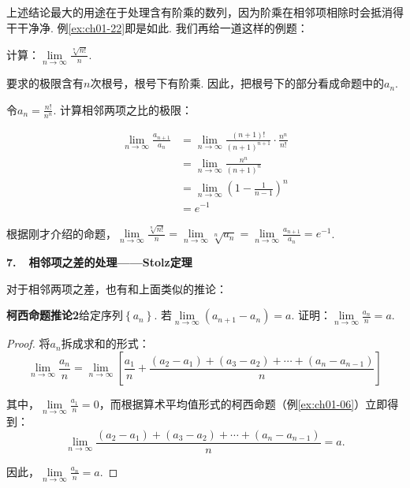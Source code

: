上述结论最大的用途在于处理含有阶乘的数列，因为阶乘在相邻项相除时会抵消得干干净净. 例\ref{ex:ch01-22}即是如此. 我们再给一道这样的例题：

\begin{example}
\label{ex:ch01-28}
计算：$\lim\limits_{n \to \infty}\displaystyle\frac{\sqrt[n]{n!}}{n} $.
\end{example}

\begin{analysis}
要求的极限含有$n$次根号，根号下有阶乘. 因此，把根号下的部分看成命题中的$a_{n}$.
\end{analysis}

\begin{solution}
令$a_{n} = \displaystyle\frac{n!}{n^{n}}$. 计算相邻两项之比的极限：\par
\begin{equation}
    \begin{aligned}
        \lim\limits_{n \to \infty}\frac{a_{n+1}}{a_{n}}
        &= \lim\limits_{n \to \infty} \frac{(n+1)!}{(n+1)^{n+1}} \cdot \frac{n^{n}}{n!} \\
        &= \lim\limits_{n \to \infty} \frac{n^{n}}{(n+1)^{n}}\\
        &= \lim\limits_{n \to \infty} \left( 1-\frac{1}{n-1}  \right)^{n}\\
        &= e^{-1}
        \nonumber
    \end{aligned}
\end{equation}
\par
根据刚才介绍的命题，$\lim\limits_{n \to \infty}\displaystyle\frac{\sqrt[n]{n!}}{n} = \lim\limits_{n \to \infty} \sqrt[n]{a_{n}}= \lim\limits_{n \to \infty}  \displaystyle\frac{a_{n+1}}{a_{n}} = e^{-1}$.
\end{solution}

\textbf{7.~~相邻项之差的处理——Stolz定理}\vspace{0.25em}

对于相邻两项之差，也有和上面类似的推论：

\begin{example}
\label{ex:ch01-29}
\textbf{柯西命题推论2}\quad 给定序列$\left\{ a_{n}\right\}$. 若$\lim\limits_{n \to \infty} (a_{n+1}-a_{n})=a$. 证明：$\lim\limits_{n \to \infty} \displaystyle\frac{a_{n}}{n}=a$.
\end{example}

\begin{proof}
将$a_{n}$拆成求和的形式：
$$
\lim\limits_{n \to \infty}  \displaystyle\frac{a_{n}}{n} =
\lim\limits_{n \to \infty} \left[ \frac{a_{1}}{n} + \frac{(a_{2}-a_{1}) + (a_{3}-a_{2})+ \cdots +(a_{n}-a_{n-1})}{n} \right]
$$

其中，$\lim\limits_{n \to \infty}\displaystyle\frac{a_{1}}{n}=0$，而根据算术平均值形式的柯西命题（例\ref{ex:ch01-06}）立即得到：
$$
\lim\limits_{n \to \infty} \displaystyle\frac{(a_{2}-a_{1}) + (a_{3}-a_{2})+ \cdots +(a_{n}-a_{n-1})}{n}=a.
$$
\par
因此，$\lim\limits_{n \to \infty} \displaystyle\frac{a_{n}}{n}=a$.
\end{proof}


